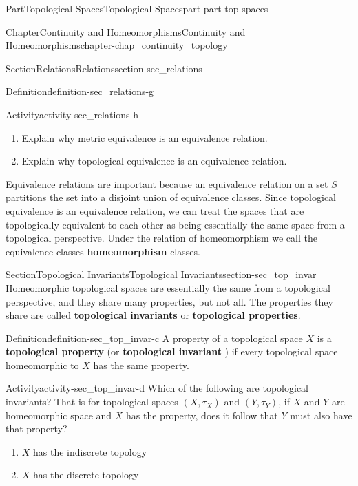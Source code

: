 \documentclass[oneside,10pt,]{book}
\newcommand{\terminology}[1]{\textbf{#1}}
\numberwithin{equation}{chapter}
\begin{document}
\begin{partptx}{Part}{Topological Spaces}{}{Topological Spaces}{}{}{part-part-top-spaces}
\begin{chapterptx}{Chapter}{Continuity and Homeomorphisms}{}{Continuity and Homeomorphisms}{}{}{chapter-chap_continuity_topology}
\begin{sectionptx}{Section}{Relations}{}{Relations}{}{}{section-sec_relations}
\begin{definition}{Definition}{}{definition-sec_relations-g}
\end{definition}
\begin{activity}{Activity}{}{activity-sec_relations-h}%
\begin{enumerate}[font=\bfseries,label=(\alph*),ref=\alph*]%
\item{}Explain why metric equivalence is an equivalence relation.%
\item{}Explain why topological equivalence is an equivalence relation.%
\end{enumerate}%
\end{activity}%
Equivalence relations are important because an equivalence relation on a set \(S\) partitions the set into a disjoint union of equivalence classes. Since topological equivalence is an equivalence relation, we can treat the spaces that are topologically equivalent to each other as being essentially the same space from a topological perspective. Under the relation of homeomorphism we call the equivalence classes \terminology{homeomorphism} classes.%
\end{sectionptx}
%
%
\typeout{************************************************}
\typeout{************************************************}
%
\begin{sectionptx}{Section}{Topological Invariants}{}{Topological Invariants}{}{}{section-sec_top_invar}
Homeomorphic topological spaces are essentially the same from a topological perspective, and they share many properties, but not all. The properties they share are called \terminology{topological invariants} or \terminology{topological properties}.%
\begin{definition}{Definition}{}{definition-sec_top_invar-c}%
%
%
A property of a topological space \(X\) is a \terminology{topological property} (or \terminology{topological invariant} ) if every topological space homeomorphic to \(X\) has the same property.%
\end{definition}
\begin{activity}{Activity}{}{activity-sec_top_invar-d}%
Which of the following are topological invariants? That is for topological spaces \((X, \tau_X)\) and \((Y, \tau_Y)\), if \(X\) and \(Y\) are homeomorphic space and \(X\) has the property, does it follow that \(Y\) must also have that property?%
\begin{enumerate}[font=\bfseries,label=(\alph*),ref=\alph*]%
\item{}\(X\) has the indiscrete topology%
\item{}\(X\) has the discrete topology%

\end{enumerate}
\end{activity}
\end{sectionptx}
\end{chapterptx}
\end{partptx}
\end{document}
